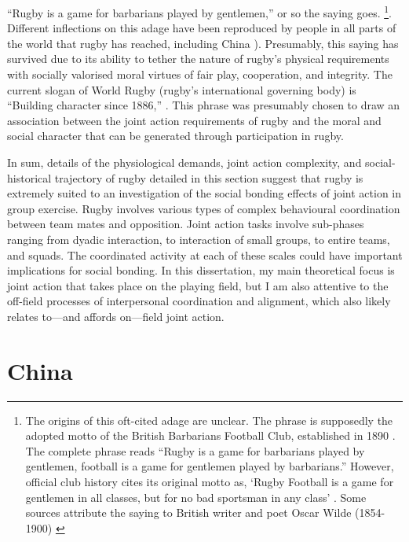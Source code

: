 \begin{CJK}{UTF8}{gbsn}
``Rugby is a game for barbarians played by gentlemen,'' or so the saying goes.
  \footnote{The origins of this oft-cited adage are unclear.  The phrase is supposedly the adopted motto of the British Barbarians Football Club, established in 1890 \citep[34]{Dunning2005}.  The complete phrase reads ``Rugby is a game for barbarians played by gentlemen, football is a game for gentlemen played by barbarians.''  However, official club history cites its original motto as, ‘Rugby Football is a game for gentlemen in all classes, but for no bad sportsman in any class' \citep[vii]{Starmer-Smith1977}.  Some sources attribute the saying to British writer and poet Oscar Wilde (1854-1900) \citep{Fleenor2015}}.
Different inflections on this adage have been reproduced by people in all parts of the world that rugby has reached, including China \citep[see][]{Taylor2010}).  Presumably, this saying has survived due to its ability to tether the nature of rugby's physical requirements with socially valorised moral virtues of fair play, cooperation, and integrity.  The current slogan of World Rugby (rugby's international governing body) is ``Building character since 1886,'' \citep{WorldRugby2017}.  This phrase was presumably chosen to draw an association between the joint action requirements of rugby and the moral and social character that can be generated through participation in rugby.

In sum, details of the physiological demands, joint action complexity, and social-historical trajectory of rugby detailed in this section suggest that rugby is extremely suited to an investigation of the social bonding effects of joint action in group exercise.  Rugby involves various types of complex behavioural coordination between team mates and opposition.  Joint action tasks involve sub-phases ranging from dyadic interaction, to interaction of small groups, to entire teams, and squads.  The coordinated activity at each of these scales could have important implications for social bonding.  In this dissertation, my main theoretical focus is joint action that takes place on the playing field, but I am also attentive to the off-field processes of interpersonal coordination and alignment, which also likely relates to---and affords on---field joint action.



\section{China}


\end{CJK}
